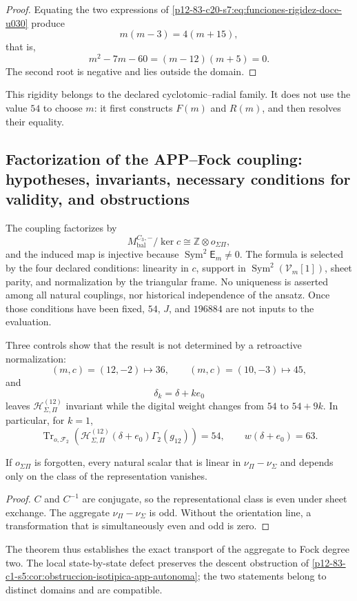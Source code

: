 \begin{proof}
Equating the two expressions of
\eqref{p12-83-c20-s7:eq:funciones-rigidez-doce-u030} produce
\[
 m(m-3)=4(m+15),
\]
that is,
\[
 m^2-7m-60=(m-12)(m+5)=0.
\]
The second root is negative and lies outside the domain.
\end{proof}

This rigidity belongs to the declared cyclotomic--radial family. It does not use the
value \(54\) to choose \(m\): it first constructs \(F(m)\) and \(R(m)\), and
then resolves their equality.

\subsection{Factorization of the APP–Fock coupling: hypotheses, invariants, necessary
conditions for validity, and obstructions}

The coupling factorizes by
\[
M_{\mathrm{bal}}^{C_3,-}/\ker c
\cong\mathbb Z\otimes o_{\Sigma\Pi},
\]
and the induced map is injective because
\(\operatorname{Sym}^2\mathsf E_m\neq0\).
The formula is selected by the four declared conditions:
linearity in \(c\), support in
\(\operatorname{Sym}^2(\mathcal V_m[1])\), sheet parity,
and normalization by the triangular frame. No uniqueness is asserted
among all natural couplings, nor historical independence of the
ansatz. Once those conditions have been fixed, \(54\), \(J\), and \(196884\) are not
inputs to the evaluation.

Three controls show that the result is not determined by a retroactive normalization:
\[
(m,c)=(12,-2)\longmapsto36,\qquad
(m,c)=(10,-3)\longmapsto45,
\]
and
\[
\delta_k=\delta+ke_0
\]
leaves \(\mathcal H_{\Sigma,\Pi}^{(12)}\) invariant while the digital weight
changes from \(54\) to \(54+9k\). In particular, for \(k=1\),
\[
\operatorname{Tr}_{o,\mathcal F_2}
\left(
\mathcal H_{\Sigma,\Pi}^{(12)}(\delta+e_0)\Gamma_2(g_{12})
\right)=54,
\qquad
w(\delta+e_0)=63.
\]

\begin{proposition}
\label{p12-83-c20-s7:prop:orientacion-app-fock}
If \(o_{\Sigma\Pi}\) is forgotten, every natural scalar that is linear in
\(\nu_\Pi-\nu_\Sigma\) and depends only on the class of the representation
vanishes.
\end{proposition}

\begin{proof}
\(C\) and \(C^{-1}\) are conjugate, so the representational class is
even under sheet exchange. The aggregate
\(\nu_\Pi-\nu_\Sigma\) is odd. Without the orientation line, a
transformation that is simultaneously even and odd is zero.
\end{proof}

The theorem thus establishes the exact transport of the aggregate to Fock
degree two. The local state-by-state defect preserves the descent obstruction
of \cref{p12-83-c1-s5:cor:obstruccion-isotipica-app-autonoma}; the two statements belong to
distinct domains and are compatible.


